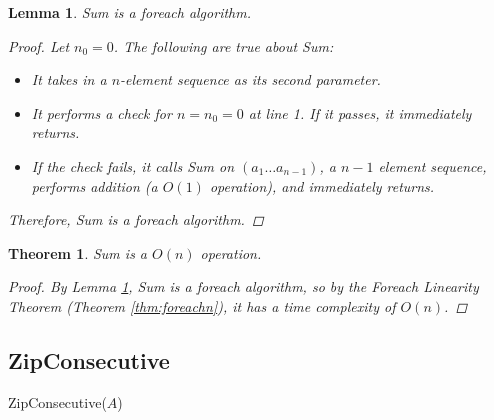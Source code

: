 \documentclass{article}
\newtheorem{theorem}{Theorem}
\newtheorem{lemma}{Lemma}
\theoremstyle{definition}
\begin{document}
\begin{lemma}
    Sum is a foreach algorithm.
    \label{lem:sumforeach}
    \begin{proof}
        Let $n_0 = 0$. The following are true about Sum:
        \begin{itemize}
            \item It takes in a $n$-element sequence as its second parameter.
            \item It performs a check for $n = n_0 = 0$ at line 1. If it passes, it immediately returns.
            \item If the check fails, it calls Sum on $(a_1 \dots a_{n-1})$, a $n-1$ element sequence, performs addition (a $O(1)$ operation), and immediately returns.
        \end{itemize}
        
        Therefore, Sum is a foreach algorithm.
    \end{proof}
\end{lemma}

\begin{theorem}
    Sum is a $O(n)$ operation.
    \label{thm:omap}
    \begin{proof}
        By Lemma \ref{lem:sumforeach}, Sum is a foreach algorithm, so by the Foreach Linearity Theorem (Theorem \ref{thm:foreachn}), it has a time complexity of $O(n)$.
    \end{proof}
\end{theorem}

\subsection{ZipConsecutive}
\begin{algorithm}

    \caption{ZipConsecutive($A$)}
\end{algorithm}
\end{document}

